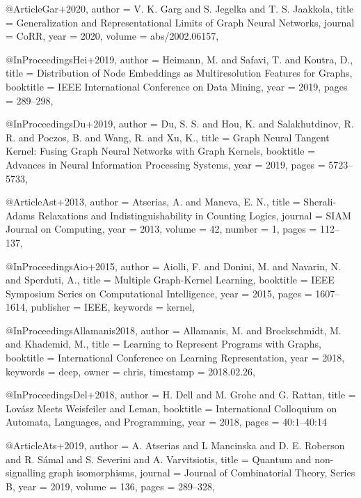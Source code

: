 @Article{Gar+2020,
  author  = {V. K. Garg and S. Jegelka and T. S. Jaakkola},
  title   = {Generalization and Representational Limits of Graph Neural Networks},
  journal = {CoRR},
  year    = {2020},
  volume  = {abs/2002.06157},
}

@InProceedings{Hei+2019,
  author    = {Heimann, M. and Safavi, T. and Koutra, D.},
  title     = {Distribution of Node Embeddings as Multiresolution Features for Graphs},
  booktitle = {{IEEE} International Conference on Data Mining},
  year      = {2019},
  pages     = {289--298},
}

@InProceedings{Du+2019,
  author    = {Du, S. S. and Hou, K. and Salakhutdinov, R. R. and Poczos, B. and Wang, R. and Xu, K.},
  title     = {{Graph Neural Tangent Kernel:} {F}using Graph Neural Networks with Graph Kernels},
  booktitle = {Advances in Neural Information Processing Systems},
  year      = {2019},
  pages     = {5723--5733},
}

@Article{Ast+2013,
  author  = {Atserias, A. and Maneva, E. N.},
  title   = {Sherali-Adams Relaxations and Indistinguishability in Counting Logics},
  journal = {{SIAM} Journal on Computing},
  year    = {2013},
  volume  = {42},
  number  = {1},
  pages   = {112--137},
}

@InProceedings{Aio+2015,
  author    = {Aiolli, F. and Donini, M. and Navarin, N. and Sperduti, A.},
  title     = {Multiple Graph-Kernel Learning},
  booktitle = {IEEE Symposium Series on Computational Intelligence},
  year      = {2015},
  pages     = {1607--1614},
  publisher = {IEEE},
  keywords  = {kernel},
}

@InProceedings{Allamanis2018,
  author    = {Allamanis, M. and Brockschmidt, M. and Khademid, M.},
  title     = {Learning to Represent Programs with Graphs},
  booktitle = {International Conference on Learning Representation},
  year      = {2018},
  keywords  = {deep},
  owner     = {chris},
  timestamp = {2018.02.26},
}

@InProceedings{Del+2018,
  author    = {H. Dell and M. Grohe and G. Rattan},
  title     = {Lov{\'{a}}sz Meets {W}eisfeiler and {L}eman},
  booktitle = {International Colloquium on Automata, Languages, and Programming},
  year      = {2018},
  pages     = {40:1--40:14}
}

@Article{Ats+2019,
  author  = {A. Atserias and L Mancinska and D. E. Roberson and R. S{\'{a}}mal and S. Severini and A. Varvitsiotis},
  title   = {Quantum and non-signalling graph isomorphisms},
  journal = {Journal of Combinatorial Theory, Series B},
  year    = {2019},
  volume  = {136},
  pages   = {289--328},
}

